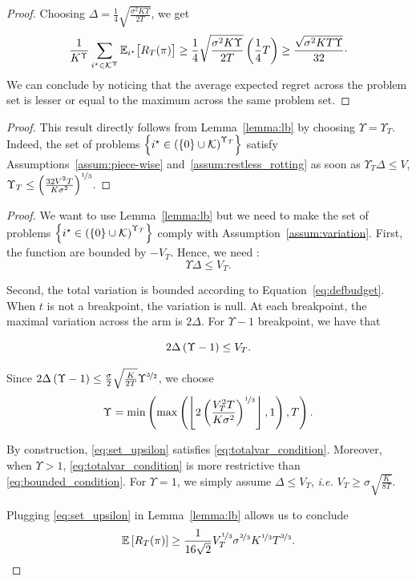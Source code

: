 \begin{proof}
Choosing $\Delta = \frac{1}{4}\sqrt{\frac{\sigma^2K\Upsilon}{2T}}$, we get 
\[
 \frac{1}{K^{\Upsilon}} \sum_{i^\star\in \mathcal{K}^{\Upsilon}}  \mathbb{E}_{i^\star}\big[R_T(\pi)\big]  \geq  \frac{1}{4}\sqrt{\frac{\sigma^2K\Upsilon}{2T}}\left(\frac{1}{4}T\right) \geq \frac{\sqrt{\sigma^2KT\Upsilon}}{32}\cdot
\]
We can conclude by noticing that the average expected regret across the problem set is lesser or equal to the maximum across the same problem set.
\end{proof}
\restapiecewiselb*
\begin{proof}
This result directly follows from Lemma~\ref{lemma:lb} by choosing $\Upsilon = \Upsilon_T$. Indeed, the set of problems $\left\{i^\star \in \left(\left\{0\right\} \cup \mathcal{K}\right)^{\Upsilon_T} \right\}$ satisfy Assumptions~\ref{assum:piece-wise} and~\ref{assum:restless_rotting} as soon as $\Upsilon_T\Delta \leq V$, \ie $\Upsilon_T \leq \left(\frac{32V^2T }{K\sigma^2}\right)^{\nicefrac{1}{3}}$.
\end{proof}

\restavariationlb*
\begin{proof}
\sloppy
We want to use Lemma~\ref{lemma:lb} but we need to make the set of problems $\left\{i^\star \in \left(\left\{0\right\} \cup \mathcal{K}\right)^{\Upsilon_T} \right\}$ comply with Assumption~\ref{assum:variation}. First, the function are bounded by $-V_T$. Hence, we need : 
\begin{equation}
\label{eq:bounded_condition}
  \Upsilon \Delta \leq V_T.  
\end{equation}

Second, the total variation is bounded according to Equation~\ref{eq:defbudget}. When $t$ is not a breakpoint, the variation is null. At each breakpoint, the maximal variation across the arm is $2\Delta$. For $\Upsilon-1$ breakpoint, we have that 


\begin{equation}
\label{eq:totalvar_condition}
  2\Delta \left(\Upsilon-1\right)  \leq V_T.  
\end{equation}

Since $ 2\Delta \left(\Upsilon-1\right) \leq \frac{\sigma}{2}\sqrt{\frac{K}{2T}}\Upsilon^{\nicefrac{3}{2}} $, we choose 
\begin{equation}
\label{eq:set_upsilon}
\Upsilon = \min\left(\max\left(\left\lfloor 2\left(\frac{V_T^{2}T}{K\sigma^{2}}\right)^{\nicefrac{1}{3}}\right\rfloor,1\right),T\right).
\end{equation}

By construction, \ref{eq:set_upsilon} satisfies \ref{eq:totalvar_condition}. Moreover, when $\Upsilon >1$, \ref{eq:totalvar_condition} is more restrictive than \ref{eq:bounded_condition}. For $\Upsilon = 1$, we simply assume $\Delta \leq V_T$, \textit{i.e.} $V_{T} \geq \sigma \sqrt{\frac{K}{8 T}}$.

Plugging \ref{eq:set_upsilon} in Lemma~\ref{lemma:lb} allows us to conclude 
\[
    \mathbb{E}\left[R_T(\pi)\right] \geq \frac{1}{16\sqrt{2}} V_T^{\nicefrac{1}{3}}\sigma^{\nicefrac{2}{3}}K^{\nicefrac{1}{3}}T^{\nicefrac{2}{3}}.
\]
\end{proof}